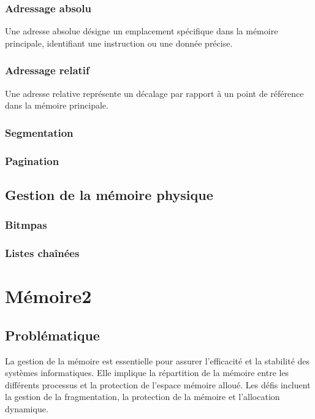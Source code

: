 \subsubsection{Adressage absolu}
Une adresse absolue désigne un emplacement spécifique dans la mémoire principale, identifiant une instruction ou une donnée précise.

\subsubsection{Adressage relatif}
Une adresse relative représente un décalage par rapport à un point de référence dans la mémoire principale.
\subsubsection{Segmentation}
\subsubsection{Pagination}

\subsection{Gestion de la mémoire physique}
\subsubsection{Bitmpas}
\subsubsection{Listes chaînées}



\section{Mémoire2}\label{sec:memoire2}

\subsection{Problématique}
La gestion de la mémoire est essentielle pour assurer l'efficacité et la stabilité des systèmes informatiques. 
Elle implique la répartition de la mémoire entre les différents processus et la protection de l'espace mémoire alloué. 
Les défis incluent la gestion de la fragmentation, la protection de la mémoire et l'allocation dynamique.

